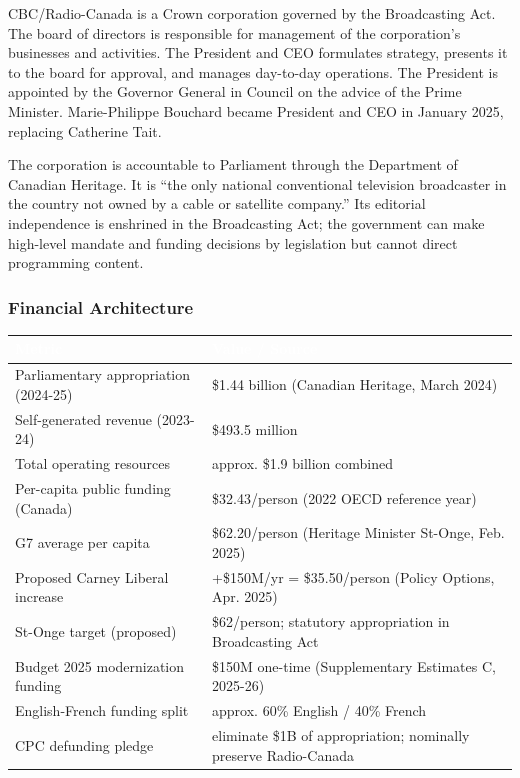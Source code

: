 \documentclass[11pt,letterpaper]{article}
\newcommand{\tableheader}[1]{\textbf{\sffamily\textcolor{white}{#1}}}
\begin{document}
CBC/Radio-Canada is a Crown corporation governed by the Broadcasting Act. The board of directors is responsible for management of the corporation's businesses and activities. The President and CEO formulates strategy, presents it to the board for approval, and manages day-to-day operations. The President is appointed by the Governor General in Council on the advice of the Prime Minister. Marie-Philippe Bouchard became President and CEO in January 2025, replacing Catherine Tait.

The corporation is accountable to Parliament through the Department of Canadian Heritage. It is ``the only national conventional television broadcaster in the country not owned by a cable or satellite company.'' Its editorial independence is enshrined in the Broadcasting Act; the government can make high-level mandate and funding decisions by legislation but cannot direct programming content.

\subsubsection{Financial Architecture}

\begin{center}
\begin{tabularx}{\textwidth}{L{4cm}X}
\toprule
{}
\tableheader{Metric} & \tableheader{Value / Source} \\
\midrule
Parliamentary appropriation (2024-25) & \$1.44 billion (Canadian Heritage, March 2024) \\
Self-generated revenue (2023-24) & \$493.5 million \\
Total operating resources & approx. \$1.9 billion combined \\
Per-capita public funding (Canada) & \$32.43/person (2022 OECD reference year) \\
G7 average per capita & \$62.20/person (Heritage Minister St-Onge, Feb. 2025) \\
Proposed Carney Liberal increase & +\$150M/yr = \$35.50/person (Policy Options, Apr. 2025) \\
St-Onge target (proposed) & \$62/person; statutory appropriation in Broadcasting Act \\
Budget 2025 modernization funding & \$150M one-time (Supplementary Estimates C, 2025-26) \\
English-French funding split & approx. 60\% English / 40\% French \\
CPC defunding pledge & eliminate \$1B of appropriation; nominally preserve Radio-Canada \\
\bottomrule
\end{tabularx}
\end{center}
\end{document}
